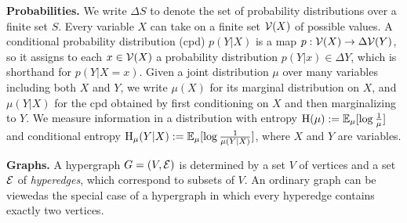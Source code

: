 \documentclass[twoside]{article}
\begin{document}
\textbf{Probabilities.}
We write $\Delta S$ to denote the set of probability distributions over a finite set $S$.
Every variable $X$ can take on a finite set $\mathcal V(X)$ of possible values. 
A conditional probability distribution (cpd) $p(Y|X)$ is a map 
$p : \mathcal V(X) \to \Delta \mathcal V(Y)$, so it assigns to each $x \in \mathcal V(X)$ a
probability distribution $p(Y|x) \in \Delta Y$, which is shorthand for $p(Y|X\!\!=\!x)$.
Given a joint distribution $\mu$ over many variables including both $X$ and $Y$, 
we write $\mu(X)$ for its marginal distribution on $X$, 
and $\mu(Y|X)$ for the cpd obtained by first conditioning on $X$ and then marginalizing to $Y$. 
We measure information in a distribution with entropy $\operatorname{\mathrm{H}}(\mu) := \operatorname*{\mathbb{E}}_{\mu} [\log \frac1\mu]$ and conditional entropy $\operatorname{\mathrm{H}}_\mu(Y|X) := \operatorname*{\mathbb{E}}_\mu[\log\frac1{\mu(Y|X)}]$, where $X$ and $Y$ are variables.



\textbf{Graphs.}
A hypergraph $G = (V, \mathcal E)$ is determined by a set $V$ of vertices
and a set
$\mathcal E$ of \emph{hyperedges}, which correspond to subsets of $V$.  
An ordinary graph can be viewedas the special case of a hypergraph in
which every 
hyperedge contains exactly two vertices. 
\end{document}
